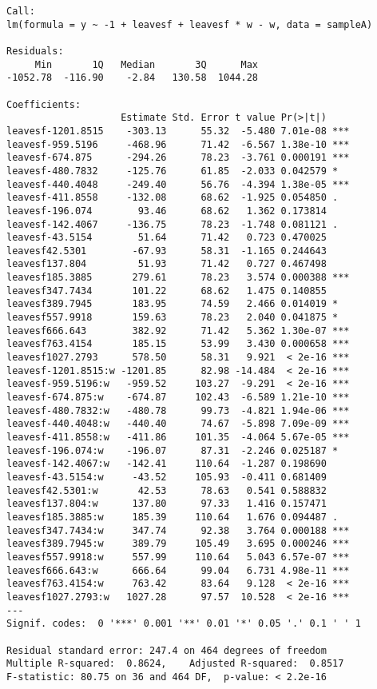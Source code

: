 \documentclass{article}
\begin{document}
\begin{verbatim}
Call:
lm(formula = y ~ -1 + leavesf + leavesf * w - w, data = sampleA)

Residuals:
     Min       1Q   Median       3Q      Max 
-1052.78  -116.90    -2.84   130.58  1044.28 

Coefficients:
                    Estimate Std. Error t value Pr(>|t|)    
leavesf-1201.8515    -303.13      55.32  -5.480 7.01e-08 ***
leavesf-959.5196     -468.96      71.42  -6.567 1.38e-10 ***
leavesf-674.875      -294.26      78.23  -3.761 0.000191 ***
leavesf-480.7832     -125.76      61.85  -2.033 0.042579 *  
leavesf-440.4048     -249.40      56.76  -4.394 1.38e-05 ***
leavesf-411.8558     -132.08      68.62  -1.925 0.054850 .  
leavesf-196.074        93.46      68.62   1.362 0.173814    
leavesf-142.4067     -136.75      78.23  -1.748 0.081121 .  
leavesf-43.5154        51.64      71.42   0.723 0.470025    
leavesf42.5301        -67.93      58.31  -1.165 0.244643    
leavesf137.804         51.93      71.42   0.727 0.467498    
leavesf185.3885       279.61      78.23   3.574 0.000388 ***
leavesf347.7434       101.22      68.62   1.475 0.140855    
leavesf389.7945       183.95      74.59   2.466 0.014019 *  
leavesf557.9918       159.63      78.23   2.040 0.041875 *  
leavesf666.643        382.92      71.42   5.362 1.30e-07 ***
leavesf763.4154       185.15      53.99   3.430 0.000658 ***
leavesf1027.2793      578.50      58.31   9.921  < 2e-16 ***
leavesf-1201.8515:w -1201.85      82.98 -14.484  < 2e-16 ***
leavesf-959.5196:w   -959.52     103.27  -9.291  < 2e-16 ***
leavesf-674.875:w    -674.87     102.43  -6.589 1.21e-10 ***
leavesf-480.7832:w   -480.78      99.73  -4.821 1.94e-06 ***
leavesf-440.4048:w   -440.40      74.67  -5.898 7.09e-09 ***
leavesf-411.8558:w   -411.86     101.35  -4.064 5.67e-05 ***
leavesf-196.074:w    -196.07      87.31  -2.246 0.025187 *  
leavesf-142.4067:w   -142.41     110.64  -1.287 0.198690    
leavesf-43.5154:w     -43.52     105.93  -0.411 0.681409    
leavesf42.5301:w       42.53      78.63   0.541 0.588832    
leavesf137.804:w      137.80      97.33   1.416 0.157471    
leavesf185.3885:w     185.39     110.64   1.676 0.094487 .  
leavesf347.7434:w     347.74      92.38   3.764 0.000188 ***
leavesf389.7945:w     389.79     105.49   3.695 0.000246 ***
leavesf557.9918:w     557.99     110.64   5.043 6.57e-07 ***
leavesf666.643:w      666.64      99.04   6.731 4.98e-11 ***
leavesf763.4154:w     763.42      83.64   9.128  < 2e-16 ***
leavesf1027.2793:w   1027.28      97.57  10.528  < 2e-16 ***
---
Signif. codes:  0 '***' 0.001 '**' 0.01 '*' 0.05 '.' 0.1 ' ' 1

Residual standard error: 247.4 on 464 degrees of freedom
Multiple R-squared:  0.8624,	Adjusted R-squared:  0.8517 
F-statistic: 80.75 on 36 and 464 DF,  p-value: < 2.2e-16
\end{verbatim}
\end{document}
